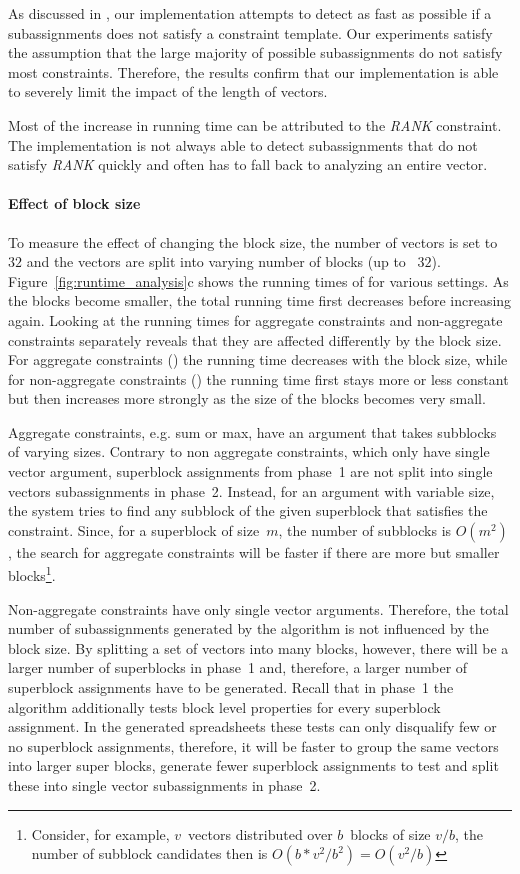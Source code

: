 As discussed in , our implementation attempts to detect as fast as possible if a subassignments does not satisfy a constraint template.
Our experiments satisfy the assumption that the large majority of possible subassignments do not satisfy most constraints.
Therefore, the results confirm that our implementation is able to severely limit the impact of the length of vectors.

Most of the increase in running time can be attributed to the \textit{RANK} constraint.
The implementation is not always able to detect subassignments that do not satisfy \textit{RANK} quickly and often has to fall back to analyzing an entire vector.

\paragraph{Effect of block size}
To measure the effect of changing the block size, the number of vectors is set to~$32$ and the vectors are split into varying number of blocks (up to ~$32$).
Figure~\ref{fig:runtime_analysis}c shows the running times of \sname for various settings.
As the blocks become smaller, the total running time first decreases before increasing again.
Looking at the running times for aggregate constraints and non-aggregate constraints  separately reveals that they are affected differently by the block size.
For aggregate constraints () the running time decreases with the block size, while for non-aggregate constraints () the running time first stays more or less constant but then increases more strongly as the size of the blocks becomes very small.

Aggregate constraints, e.g. sum or max, have an argument that takes subblocks of varying sizes.
Contrary to non aggregate constraints, which only have single vector argument, superblock assignments from phase~1 are not split into single vectors subassignments in phase~2.
Instead, for an argument with variable size, the system tries to find any subblock of the given superblock that satisfies the constraint.
Since, for a superblock of size~$m$, the number of subblocks is $O(m^2)$ , the search for aggregate constraints will be faster if there are more but smaller blocks\footnote{Consider, for example, $v$~vectors distributed over $b$~blocks of size $v/b$, the number of subblock candidates then is $O(b * v^2 / b^2) = O(v^2 / b)$}.

Non-aggregate constraints have only single vector arguments.
Therefore, the total number of subassignments generated by the algorithm is not influenced by the block size.
By splitting a set of vectors into many blocks, however, there will be a larger number of superblocks in phase~1 and, therefore, a larger number of superblock assignments have to be generated.
Recall that in phase~1 the algorithm additionally tests block level properties for every superblock assignment.
In the generated spreadsheets these tests can only disqualify few or no superblock assignments, therefore, it will be faster to group the same vectors into larger super blocks, generate fewer superblock assignments to test and split these into single vector subassignments in phase~2.

